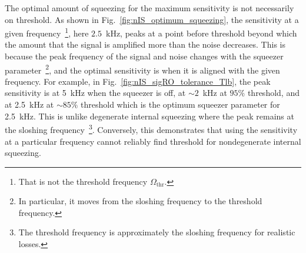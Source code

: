 
The optimal amount of squeezing for the maximum sensitivity is not necessarily on threshold. As shown in Fig.~\ref{fig:nIS_optimum_squeezing}, the sensitivity at a given frequency~\footnote{That is not the threshold frequency $\Omega_\text{thr}$.}, here $2.5$~kHz, peaks at a point before threshold beyond which the amount that the signal is amplified more than the noise decreases.
This is because the peak frequency of the signal and noise changes with the squeezer parameter~\footnote{In particular, it moves from the sloshing frequency to the threshold frequency.}, and the optimal sensitivity is when it is aligned with the given frequency. For example, in Fig.~\ref{fig:nIS_sigRO_tolerance_Tlb}, the peak sensitivity is at 5~kHz when the squeezer is off, at $\sim2$~kHz at $95\%$ threshold, and at 2.5~kHz at $\sim85\%$ threshold which is the optimum squeezer parameter for 2.5~kHz.
This is unlike degenerate internal squeezing where the peak remains at the sloshing frequency~\footnote{The threshold frequency is approximately the sloshing frequency for realistic losses.}. %
Conversely, this demonstrates that using the sensitivity at a particular frequency cannot reliably find threshold for nondegenerate internal squeezing. %


